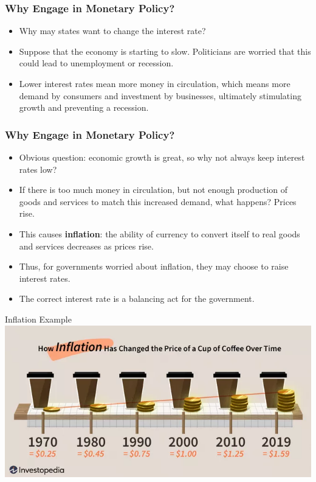 \documentclass[handout]{beamer}
\begin{document}
\begin{frame} 
	\frametitle{\LARGE{Why Engage in Monetary Policy?}}
	\begin{itemize}
		\item Why may states want to change the interest rate? \pause
		\item Suppose that the economy is starting to slow. Politicians are worried that this could lead to unemployment or recession. \pause
		\item Lower interest rates mean more money in circulation, which means more demand by consumers and investment by businesses, ultimately stimulating growth and preventing a recession. \pause
	\end{itemize}
\end{frame}


\begin{frame} 
	\frametitle{\LARGE{Why Engage in Monetary Policy?}}
	\begin{itemize}
		\item Obvious question: economic growth is great, so why not always keep interest rates low? 
		\item If there is too much money in circulation, but not enough production of goods and services to match this increased demand, what happens? \pause Prices rise.
		\item This causes \textbf{inflation}: the ability of currency to convert itself to real goods and services decreases as prices rise. \pause
		\item Thus, for governments worried about inflation, they may choose to raise interest rates.	
		\item The correct interest rate is a balancing act for the government.
	\end{itemize}
\end{frame}

\begin{frame}{\LARGE Inflation Example}
	\centering
	\includegraphics[width=\textwidth,height=0.8\textheight,keepaspectratio]{coffeeinflation.png}
\end{frame}
\end{document}
